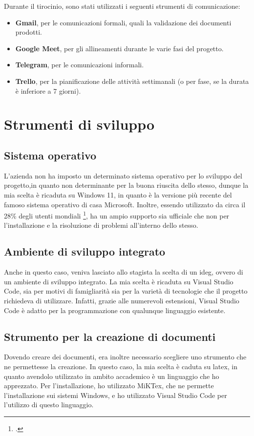 Durante il tirocinio, sono stati utilizzati i seguenti strumenti di comunicazione:
\begin{itemize}
    \item \textbf{Gmail}, per le comunicazioni formali, quali la validazione dei documenti prodotti.
    \item \textbf{Google Meet}, per gli allineamenti durante le varie fasi del progetto.
    \item \textbf{Telegram}, per le comunicazioni informali.
    \item \textbf{Trello}, per la pianificazione delle attività settimanali (o per fase, se la durata è inferiore a 7 giorni).
\end{itemize}

\section{Strumenti di sviluppo}
\label{sec:sviluppoStrum}
\subsection{Sistema operativo}
L'azienda non ha imposto un determinato sistema operativo per lo sviluppo del progetto,in quanto non determinante per la buona riuscita dello stesso, dunque la mia scelta è ricaduta su Windows 11, in quanto è la versione più recente del famoso sistema operativo di casa Microsoft. Inoltre, essendo utilizzato da circa il 28\% degli utenti mondiali \footcite{site:statOS}, ha un ampio supporto sia ufficiale che non per l'installazione e la risoluzione di problemi all'interno dello stesso.
\subsection{Ambiente di sviluppo integrato}
Anche in questo caso, veniva lasciato allo stagista la scelta di un \gls{ideg}, ovvero di un ambiente di sviluppo integrato. La mia scelta è ricaduta su Visual Studio Code, sia per motivi di famigliarità sia per la varietà di tecnologie che il progetto richiedeva di utilizzare. Infatti, grazie alle numerevoli estensioni, Visual Studio Code è adatto per la programmazione con qualunque linguaggio esistente.
\subsection{Strumento per la creazione di documenti}
Dovendo creare dei documenti, era inoltre necessario scegliere uno strumento che ne permettesse la creazione. In questo caso, la mia scelta è caduta su \gls{latex}, in quanto avendolo utilizzato in ambito accademico è un linguaggio che ho apprezzato. Per l'installazione, ho utilizzato MiKTex, che ne permette l'installazione sui sistemi Windows, e ho utilizzato Visual Studio Code per l'utilizzo di questo linguaggio.

